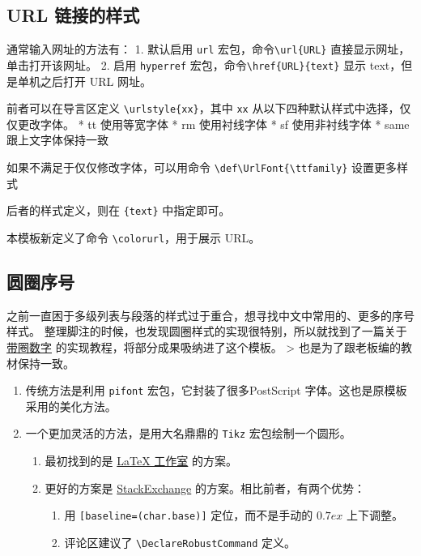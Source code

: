 \documentclass[../Main/thesis.tex]{subfiles}
\begin{document}
\subsection{URL 链接的样式}

通常输入网址的方法有： 1. 默认启用 \texttt{url}
宏包，命令\texttt{\textbackslash{}url\{URL\}}
直接显示网址，单击打开该网址。 2. 启用 \texttt{hyperref}
宏包，命令\texttt{\textbackslash{}href\{URL\}\{text\}} 显示
text，但是单机之后打开 URL 网址。

前者可以在导言区定义 \texttt{\textbackslash{}urlstyle\{xx\}}，其中
\texttt{xx} 从以下四种默认样式中选择，仅仅更改字体。 * tt 使用等宽字体 *
rm 使用衬线字体 * sf 使用非衬线字体 * same 跟上文字体保持一致

如果不满足于仅仅修改字体，可以用命令
\texttt{\textbackslash{}def\textbackslash{}UrlFont\{\textbackslash{}ttfamily\}}
设置更多样式

后者的样式定义，则在 \texttt{\{text\}} 中指定即可。

本模板新定义了命令 \texttt{\textbackslash{}colorurl}，用于展示 URL。

\subsection{圆圈序号}

之前一直困于多级列表与段落的样式过于重合，想寻找中文中常用的、更多的序号样式。
整理脚注的时候，也发现圆圈样式的实现很特别，所以就找到了一篇关于
\href{https://stone-zeng.github.io/2019-02-09-circled-numbers/}{带圈数字}
的实现教程，将部分成果吸纳进了这个模板。 \textgreater{}
也是为了跟老板编的教材保持一致。

\begin{enumerate}
\def\labelenumi{\arabic{enumi}.}
\item
  传统方法是利用 \texttt{pifont} 宏包，它封装了很多PostScript
  字体。这也是原模板采用的美化方法。
\item
  一个更加灵活的方法，是用大名鼎鼎的 \texttt{Tikz} 宏包绘制一个圆形。

  \begin{enumerate}
  \def\labelenumii{\arabic{enumii}.}
  \item
    最初找到的是
    \href{https://www.latexstudio.net/archives/1571.html}{LaTeX 工作室}
    的方案。
  \item
    更好的方案是
    \href{https://tex.stackexchange.com/questions/7032/good-way-to-make-textcircled-numbers\#}{StackExchange}
    的方案。相比前者，有两个优势：

    \begin{enumerate}
    \def\labelenumiii{\arabic{enumiii}.}
    \item
      用 \texttt{{[}baseline=(char.base){]}} 定位，而不是手动的
      \(0.7ex\) 上下调整。
    \item
      评论区建议了 \texttt{\textbackslash{}DeclareRobustCommand} 定义。
    \end{enumerate}
  \end{enumerate}
\end{enumerate}
\end{document}

